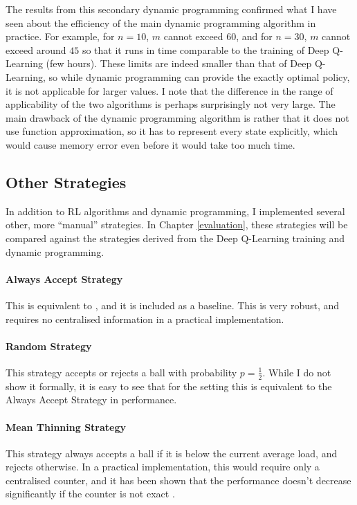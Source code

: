The results from this secondary dynamic programming confirmed what I have seen about the efficiency of the main dynamic programming algorithm in practice. For example, for $n=10$, $m$ cannot exceed $60$, and for $n=30$, $m$ cannot exceed around $45$ so that it runs in time comparable to the training of Deep Q-Learning (few hours). These limits are indeed smaller than that of Deep Q-Learning, so while dynamic programming can provide the exactly optimal policy, it is not applicable for larger values. I note that the difference in the range of applicability of the two algorithms is perhaps surprisingly not very large. The main drawback of the dynamic programming algorithm is rather that it does not use function approximation, so it has to represent every state explicitly, which would cause memory error even before it would take too much time. 


\subsection{Other Strategies}

In addition to RL algorithms and dynamic programming, I implemented several other, more ``manual'' strategies. In Chapter \ref{evaluation}, these strategies will be compared against the strategies derived from the Deep Q-Learning training and dynamic programming.


\paragraph{Always Accept Strategy}
This is equivalent to \OneChoice, and it is included as a baseline. This is very robust, and requires no centralised information in a practical implementation.


\paragraph{Random Strategy}
This strategy accepts or rejects a ball with probability $p=\frac{1}{2}$. While I do not show it formally, it is easy to see that for the \TwoThinning setting this is equivalent to the Always Accept Strategy in performance. 

\paragraph{Mean Thinning Strategy}
This strategy always accepts a ball if it is below the current average load, and rejects otherwise. In a practical implementation, this would require only a centralised counter, and it has been shown that the performance doesn't decrease significantly if the counter is not exact \cite{los2022cachingpackingthinningtwinning}. 


